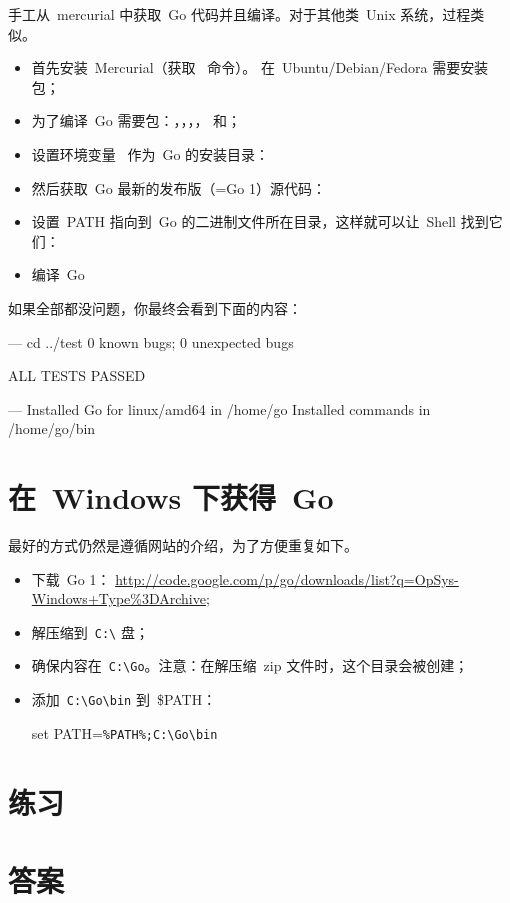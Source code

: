 手工从~mercurial 中获取~Go 代码并且编译。对于其他类~Unix 系统，过程类似。
\begin{itemize}
\item 首先安装~Mercurial（获取~ 命令）。
在~Ubuntu/Debian/Fedora 需要安装~ 包；

\item 为了编译~Go 需要包：，，，， 和；

\item 设置环境变量~ 作为~Go 的安装目录：
\begin{display}
\pr {}
\end{display}

\item 然后获取~Go 最新的发布版（=Go 1）源代码：
\begin{display}
\pr {}
\end{display}

\item 设置~PATH 指向到~Go 的二进制文件所在目录，这样就可以让~Shell 找到它们：
\begin{display}
\pr {}
\end{display}
\item 编译~Go
\begin{display}
\pr {}
\pr {}
\end{display}
\end{itemize}
如果全部都没问题，你最终会看到下面的内容：
\begin{display}
--- cd ../test
0 known bugs; 0 unexpected bugs

ALL TESTS PASSED

---
Installed Go for linux/amd64 in /home/go
Installed commands in /home/go/bin
\end{display}

\section{在~Windows 下获得~Go}
最好的方式仍然是遵循网站\cite{go_install}的介绍，为了方便重复如下。

\begin{itemize}
\item 下载~Go 1：
\url{http://code.google.com/p/go/downloads/list?q=OpSys-Windows+Type%3DArchive};
\item 解压缩到~\verb|C:\| 盘；
\item 确保内容在~\verb|C:\Go|。注意：在解压缩~zip 文件时，这个目录会被创建；
\item 添加~\verb|C:\Go\bin| 到~\$PATH：
\begin{display}
set PATH=\verb|%PATH%;C:\Go\bin|
\end{display}
\end{itemize}

\section{练习}


\cleardoublepage
\section{答案}
\shipoutAnswer
